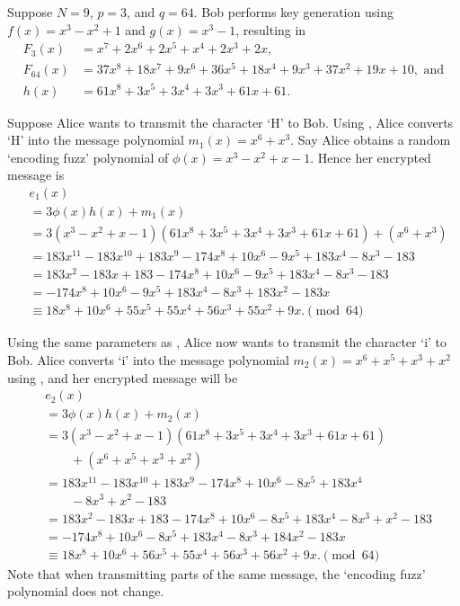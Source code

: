 \begin{example}\label{example-ntru-case-1}
    Suppose $N = 9$, $p = 3$, and $q = 64$. Bob performs key generation using $f(x) = x^3 - x^2 + 1$ and $g(x) = x^3 - 1$, resulting in
    \begin{align*}
        F_3(x) &= x^7 + 2x^6 + 2x^5 +x^4 + 2x^3 + 2x,\\
        F_{64}(x) &= 37x^8 + 18x^7 + 9x^6 + 36x^5 + 18x^4 + 9x^3 + 37x^2 + 19x + 10, \text{ and}\\
        h(x) &= 61x^8 + 3x^5 + 3x^4 + 3x^3 + 61x + 61.
    \end{align*}

    Suppose Alice wants to transmit the character `H' to Bob. Using , Alice converts `H' into the message polynomial $m_1(x) = x^6 + x^3$. Say Alice obtains a random `encoding fuzz' polynomial of $\phi(x) = x^{3} - x^{2} + x - 1$. Hence her encrypted message is
    \begin{align*}
        &e_1(x)\\
        &= 3\phi(x)h(x) + m_1(x)\\
        &= 3(x^3 -x^2 +x - 1)(61x^8 + 3x^5 + 3x^4 + 3x^3 + 61x + 61) + (x^6 + x^3)\\
        &= 183x^{11} - 183x^{10} + 183x^9 - 174x^8 + 10x^6 - 9x^5 + 183x^4 - 8x^3 - 183\\
        &= 183x^2 - 183x + 183 - 174x^8 + 10x^6 - 9x^5 + 183x^4 - 8x^3 - 183\\
        &= -174x^8 + 10x^6 - 9x^5 + 183x^4 - 8x^3 + 183x^2 - 183x\\
        &\equiv 18x^8 + 10x^6 + 55x^5 + 55x^4 + 56x^3 + 55x^2 + 9x. \pmod{64}
    \end{align*}
\end{example}

\begin{example}\label{example-ntru-case-2}
    Using the same parameters as , Alice now wants to transmit the character `i' to Bob. Alice converts `i' into the message polynomial $m_2(x) = x^6 + x^5 + x^3 + x^2$ using , and her encrypted message will be
    \begin{align*}
        &e_2(x)\\
        &= 3\phi(x)h(x) + m_2(x)\\
        &= 3(x^3 - x^2 + x - 1)(61x^8 + 3x^5 + 3x^4 + 3x^3 + 61x + 61)\\
        &\quad\quad+ (x^6 + x^5 + x^3 + x^2)\\
        &= 183x^{11} - 183x^{10} + 183x^9 - 174x^8 + 10x^6 - 8x^5 + 183x^4\\
        &\quad\quad- 8x^3 + x^2 - 183\\
        &= 183x^2 - 183x + 183 - 174x^8 + 10x^6 - 8x^5 + 183x^4 - 8x^3 + x^2 - 183\\
        &= -174x^8 + 10x^6 - 8x^5 + 183x^4 - 8x^3 + 184x^2 - 183x\\
        &\equiv 18x^8 + 10x^6 + 56x^5 + 55x^4 + 56x^3 + 56x^2 + 9x. \pmod{64}
    \end{align*}
    Note that when transmitting parts of the same message, the `encoding fuzz' polynomial does not change.
\end{example}

